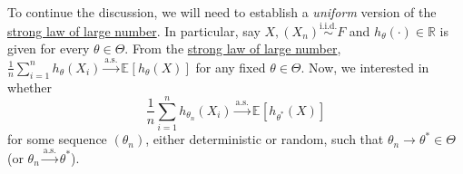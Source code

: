 To continue the discussion, we will need to establish a \emph{uniform} version of the \hyperref[thm:SLLN]{strong law of large number}. In particular, say \(X, (X_n) \overset{\text{i.i.d.} }{\sim } F\) and \(h_\theta (\cdot) \in \mathbb{R} \) is given for every \(\theta \in \Theta \). From the \hyperref[thm:SLLN]{strong law of large number}, \(\frac{1}{n}\sum_{i=1}^{n} h_\theta (X_i) \overset{\text{a.s.} }{\to} \mathbb{E}_{}[h_\theta (X)] \) for any fixed \(\theta \in \Theta \). Now, we interested in whether
\[
	\frac{1}{n} \sum_{i=1}^{n} h_{\theta _n}(X_i)
	\overset{\text{a.s.} }{\to} \mathbb{E}_{}[h_{\theta ^{\ast}}(X)]
\]
for some sequence \((\theta _n)\), either deterministic or random, such that \(\theta _n \to \theta ^{\ast} \in \Theta \) (or \(\theta _n \overset{\text{a.s.} }{\to} \theta ^{\ast} \)).

